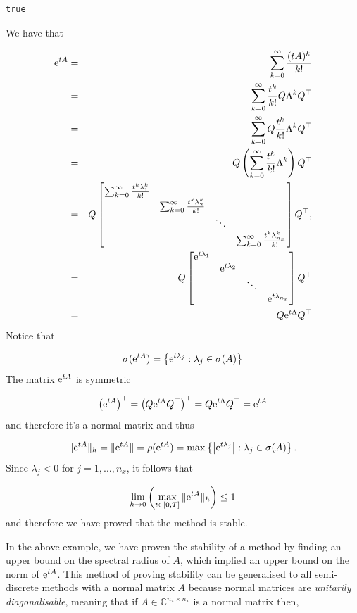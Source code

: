 \documentclass[12pt,a4paper]{article}
\begin{document}
\begin{lstlisting}
true
\end{lstlisting}


We have that


\begin{eqnarray*}
{\rm e}^{tA} &=& \sum_{k = 0}^{\infty} \frac{(tA)^k}{k!} \\
&=& \sum_{k = 0}^{\infty}\frac{t^k}{k!} Q \Lambda^k Q^{\top} \\
&=& \sum_{k = 0}^{\infty} Q \frac{t^k}{k!}\Lambda^k Q^{\top} \\
&=& Q \left(\sum_{k = 0}^{\infty}  \frac{t^k}{k!}\Lambda^k\right) Q^{\top} \\
&=&  Q
\begin{bmatrix}
\sum_{k = 0}^{\infty}  \frac{t^k\lambda_1^k}{k!} & & & \\
& \sum_{k = 0}^{\infty}  \frac{t^k\lambda_2^k}{k!} & & \\
 & & \ddots &  \\
&  & & \sum_{k = 0}^{\infty}  \frac{t^k\lambda_{n_x}^k}{k!}
\end{bmatrix} Q^{\top}, \\
&=&  Q
\begin{bmatrix}
 {\rm e}^{t\lambda_1}& & & \\
& {\rm e}^{t\lambda_2} & & \\
 & & \ddots &  \\
&  & & {\rm e}^{t\lambda_{n_x}}
\end{bmatrix} Q^{\top} \\
&=& Q{\rm e}^{t\Lambda}Q^{\top}
\end{eqnarray*}
Notice that

\[
\sigma({\rm e}^{tA}) = \left\lbrace {\rm e}^{t\lambda_j} : \lambda_j \in \sigma(A)   \right\rbrace
\]
The matrix ${\rm e}^{tA}$ is symmetric

\[
\left({\rm e}^{tA}\right)^{\top} = \left(Q{\rm e}^{t\Lambda}Q^{\top}\right)^{\top} = Q{\rm e}^{t\Lambda}Q^{\top} = {\rm e}^{tA}
\]
and therefore it's a normal matrix and thus

\[
\| {\rm e}^{tA} \|_h = \| {\rm e}^{tA} \| = \rho({\rm e}^{tA}) = \max \left\lbrace \left\vert {\rm e}^{t\lambda_j} \right\vert : \lambda_j \in \sigma(A)   \right\rbrace.
\]
Since $\lambda_j < 0$ for $j = 1, \ldots, n_x$, it follows that

\[
\lim_{h \to 0}\left(\max_{t \in [0, T]}\| {\rm e}^{tA}\|_h \right) \leq 1
\]
and therefore we have proved that the method is stable.

In the above example, we have proven the stability of a method by finding an upper bound on the spectral radius of $A$, which implied an upper bound on the norm of ${\rm e}^{tA}$.  This method of proving stability can be generalised to all semi-discrete methods with a normal matrix $A$ because normal matrices are \emph{unitarily diagonalisable}, meaning that if $A \in \mathbb{C}^{n_x \times n_x}$ is a normal matrix then,
\end{document}
